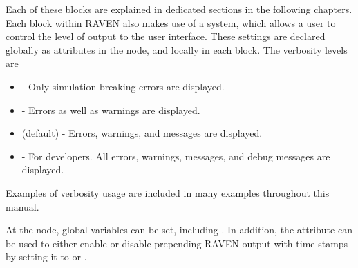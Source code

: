 Each of these blocks are explained in dedicated sections in the following
chapters.
%
Each block within RAVEN also makes use of a  system,
which allows a user to control the level of output to the user interface.
These settings are declared globally as attributes in the  node,
and locally in each block.  The verbosity levels are
\begin{itemize}
\item {} - Only simulation-breaking errors are displayed.
\item {} - Errors as well as warnings are displayed.
\item {} (default) - Errors, warnings, and messages are displayed.
\item {} - For developers. All errors, warnings, messages, and debug messages are displayed.
\end{itemize}
Examples of verbosity usage are included in many examples throughout this manual.

At the  node, global variables can be set, including .  In addition, the
attribute  can be used to either enable or disable prepending RAVEN output with time stamps
by setting it to  or .
